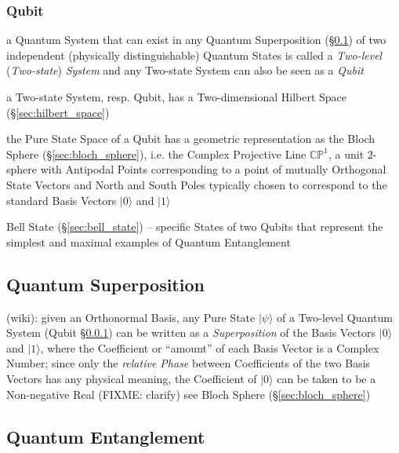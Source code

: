 \subsubsection{Qubit}\label{sec:qubit}

a Quantum System that can exist in any Quantum Superposition
(\S\ref{sec:quantum_superposition}) of two independent (physically
distinguishable) Quantum States is called a \emph{Two-level} (\emph{Two-state})
\emph{System} and any Two-state System can also be seen as a \emph{Qubit}

a Two-state System, resp. Qubit, has a Two-dimensional Hilbert Space
(\S\ref{sec:hilbert_space})

the Pure State Space of a Qubit has a geometric representation as the Bloch
Sphere (\S\ref{sec:bloch_sphere}), i.e. the Complex Projective Line
$\mathbb{CP}^1$, a unit $2$-sphere with Antipodal Points corresponding to a
point of mutually Orthogonal State Vectors and North and South Poles typically
chosen to correspond to the standard Basis Vectors $|0\rangle$ and $|1\rangle$

\fist Bell State (\S\ref{sec:bell_state}) -- specific States of two Qubits that
represent the simplest and maximal examples of Quantum Entanglement



\subsection{Quantum Superposition}\label{sec:quantum_superposition}

(wiki): given an Orthonormal Basis, any Pure State $|\psi\rangle$ of a Two-level
Quantum System (Qubit \S\ref{sec:qubit}) can be written as a
\emph{Superposition} of the Basis Vectors $|0\rangle$ and $|1\rangle$, where the
Coefficient or ``amount'' of each Basis Vector is a Complex Number; since only
the \emph{relative Phase} between Coefficients of the two Basis Vectors has any
physical meaning, the Coefficient of $|0\rangle$ can be taken to be a
Non-negative Real (FIXME: clarify) \fist see Bloch Sphere
(\S\ref{sec:bloch_sphere})



\subsection{Quantum Entanglement}\label{sec:quantum_entanglement}

